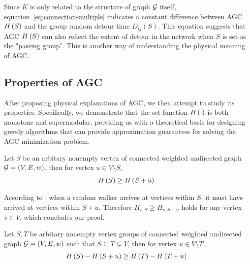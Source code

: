 \documentclass[journal]{IEEEtran}
\begin{document}
Since \(K\) is only related to the structure of graph \(\mathcal{G}\) itself, equation~\eqref{eq:connection-multiple} indicates a constant difference between AGC \(H\left(S\right)\) and the group random detour time \(D_{ij}(S)\).
This equation suggests that AGC \(H\left(S\right)\) can also reflect the extent of detour in the network when \(S\) is set as the "passing group".
This is another way of understanding the physical meaning of AGC.

\subsection{Properties of AGC}


After proposing physical explanations of AGC, we then attempt to study its properties.
Specifically, we demonstrate that the set function \(H\left(\cdot\right)\) is both monotone and supermodular, providing us with a theoretical basis for designing greedy algorithms that can provide approximation guarantees for solving the AGC minimization problem.

\begin{theorem}[Monotonicity]\label{thm:mono}
    Let \(S\) be an arbitary nonempty vertex of connected weighted undirected graph \(\mathcal{G}=(V,E,w)\), then for vertex \(u\in V\setminus S\),
    \begin{equation*}
        H\left(S\right)\ge H\left(S+u\right).
    \end{equation*}
\end{theorem}

\begin{IEEEproof}
    According to , when a random walker arrives at vertices within \(S\), it must have arrived at vertices within \(S+u\). Therefore \(H_{v,S}\ge H_{v,S+u}\) holds for any vertex \(v\in V\), which concludes our proof.
\end{IEEEproof}

\begin{theorem}[Supermodularity]\label{thm:supermod}
    Let \(S,T\) be arbitary nonempty vertex groups of connected weighted undirected graph \(\mathcal{G}=(V,E,w)\) such that \(S\subseteq T\subsetneq V\), then for vertex \(u\in V\setminus T\),
    \begin{equation*}
        H\left(S\right)-H\left(S+u\right)\ge H\left(T\right)-H\left(T+u\right).
    \end{equation*}
\end{theorem}
\end{document}
